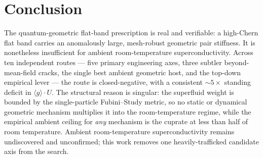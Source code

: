 \documentclass[11pt,a4paper]{article}
\newcommand{\qgg}{\langle g \rangle}
\begin{document}
\section{Conclusion}
The quantum-geometric flat-band prescription is real and verifiable: a high-Chern flat band carries
an anomalously large, mesh-robust geometric pair stiffness. It is nonetheless insufficient for
ambient room-temperature superconductivity. Across ten independent routes --- five primary
engineering axes, three subtler beyond-mean-field cracks, the single best ambient geometric host,
and the top-down empirical lever --- the route is closed-negative, with a consistent
$\sim 5\times$ standing deficit in $\qgg\!\cdot\!U$. The structural reason is singular: the
superfluid weight is bounded by the single-particle Fubini--Study metric, so no static or dynamical
geometric mechanism multiplies it into the room-temperature regime, while the empirical ambient
ceiling for \emph{any} mechanism is the cuprate at less than half of room temperature. Ambient
room-temperature superconductivity remains undiscovered and unconfirmed; this work removes one
heavily-trafficked candidate axis from the search.



\end{document}
